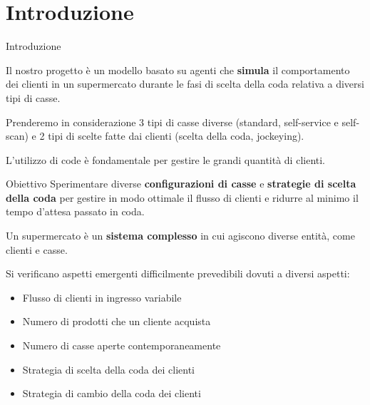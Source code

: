 \section{Introduzione}
\begin{frame}{Introduzione}
	
	Il nostro progetto è un modello basato su agenti che \textbf{simula} il comportamento dei clienti in un supermercato durante le fasi di scelta della coda relativa a diversi tipi di casse.
	
	Prenderemo in considerazione 3 tipi di casse diverse (standard, self-service e self-scan) e 2 tipi di scelte fatte dai clienti (scelta della coda, jockeying).
	
	L'utilizzo di code è fondamentale per gestire le grandi quantità di clienti.
	
	\begin{block}{Obiettivo}
		Sperimentare diverse \textbf{configurazioni di casse} e \textbf{strategie di scelta della coda} per gestire in modo ottimale il flusso di clienti e ridurre al minimo il tempo d'attesa passato in coda.
	\end{block}
\end{frame}

\begin{frame}
	Un supermercato è un \textbf{sistema complesso} in cui agiscono diverse entità, come clienti e casse. 
	
	Si verificano aspetti emergenti difficilmente prevedibili dovuti a diversi aspetti:
	\begin{itemize}
		\item Flusso di clienti in ingresso variabile
		\item Numero di prodotti che un cliente acquista
		\item Numero di casse aperte contemporaneamente
		\item Strategia di scelta della coda dei clienti
		\item Strategia di cambio della coda dei clienti
	\end{itemize}
\end{frame}